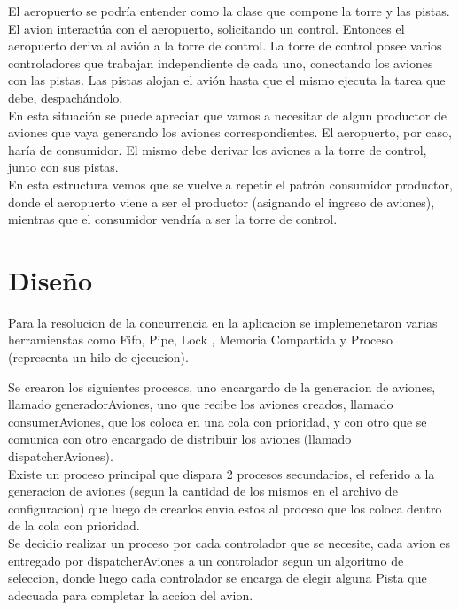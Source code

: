 \documentclass[a4paper,12pt,titlepage]{article}
\begin{document}
El aeropuerto se podría entender como la clase que compone la torre y las pistas. El avion interactúa con el
aeropuerto, solicitando un control. Entonces el aeropuerto deriva al avión a la torre de control.
La torre de control posee varios controladores que trabajan independiente de cada uno, conectando los aviones
con las pistas. Las pistas alojan el avión hasta que el mismo ejecuta la tarea que debe, despachándolo.\\

En esta situación se puede apreciar que vamos a necesitar de algun productor de aviones
que vaya generando los aviones correspondientes. El aeropuerto, por caso, haría de consumidor.
El mismo debe derivar los aviones a la torre de control, junto con sus pistas.\\
En esta estructura vemos que se vuelve a repetir el patrón consumidor productor, donde el aeropuerto
viene a ser el productor (asignando el ingreso de aviones), mientras que el consumidor vendría a ser la torre de control.\\


\newpage
\section{Diseño}

Para la resolucion de la concurrencia en la aplicacion se implemenetaron varias herramienstas como Fifo, Pipe, Lock , Memoria Compartida y Proceso (representa un hilo de ejecucion).

Se crearon los siguientes procesos, uno encargardo de la generacion de aviones, llamado generadorAviones, uno que recibe los aviones creados, llamado consumerAviones, que los coloca en una cola con prioridad, y con otro que se comunica con otro encargado de distribuir los aviones (llamado 
dispatcherAviones).\\

Existe un proceso principal que dispara 2 procesos secundarios, el referido a la generacion de aviones (segun la
cantidad de los mismos en el archivo de configuracion) que luego de crearlos envia estos al proceso que los
coloca dentro de la cola con prioridad.\\

Se decidio realizar un proceso por cada controlador que se necesite, cada avion es entregado por dispatcherAviones a un controlador segun un algoritmo de seleccion, donde luego cada controlador se encarga de elegir alguna Pista que adecuada para completar la accion del avion.\\
\end{document}
